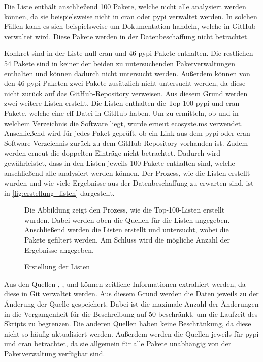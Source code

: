 Die Liste enthält anschließend 100 Pakete, welche nicht alle analysiert werden können, da sie beispielsweise nicht in \gls{cran} oder \gls{pypi} verwaltet werden.
In solchen Fällen kann es sich beispielsweise um Dokumentation handeln, welche in GitHub verwaltet wird.
Diese Pakete werden in der Datenbeschaffung nicht betrachtet.

Konkret sind in der Liste null \gls{cran} und 46 \gls{pypi} Pakete enthalten.
Die restlichen 54 Pakete sind in keiner der beiden zu untersuchenden Paketverwaltungen enthalten und können dadurch nicht untersucht werden.
Außerdem können von den 46 \gls{pypi} Paketen zwei Pakete zusätzlich nicht untersucht werden, da diese nicht zurück auf das GitHub-Repository verweisen.
Aus diesem Grund werden zwei weitere Listen erstellt.
Die Listen enthalten die Top-100 \gls{pypi} und \gls{cran} Pakete, welche eine \gls{cff}-Datei in GitHub haben.
Um zu ermitteln, ob und in welchem Verzeichnis die Software liegt, wurde erneut ecosyste.ms verwendet.
Anschließend wird für jedes Paket geprüft, ob ein Link aus dem \gls{pypi} oder \gls{cran} Software-Verzeichnis zurück zu dem GitHub-Repository vorhanden ist.
Zudem werden erneut die doppelten Einträge nicht betrachtet.
Dadurch wird gewährleistet, dass in den Listen jeweils 100 Pakete enthalten sind, welche anschließend alle analysiert werden können.
Der Prozess, wie die Listen erstellt wurden und wie viele Ergebnisse aus der Datenbeschaffung zu erwarten sind, ist in \autoref{fig:erstellung_listen} dargestellt.

\begin{figure}
    \begin{center}
        
    \end{center}
    \caption{Erstellung der Listen}
    \label{fig:erstellung_listen}
    \small
    Die Abbildung zeigt den Prozess, wie die Top-100-Listen erstellt wurden. Dabei werden oben die Quellen für die Listen angegeben. Anschließend werden die Listen erstellt und untersucht, wobei die Pakete gefiltert werden. Am Schluss wird die mögliche Anzahl der Ergebnisse angegeben.
\end{figure}

Aus den Quellen , ,  und  können zeitliche Informationen extrahiert werden, da diese in Git verwaltet werden.
Aus diesem Grund werden die Daten jeweils zu der Änderung der Quelle gespeichert.
Dabei ist die maximale Anzahl der Änderungen in die Vergangenheit für die Beschreibung auf 50 beschränkt, um die Laufzeit des Skripts zu begrenzen.
Die anderen Quellen haben keine Beschränkung, da diese nicht so häufig aktualisiert werden.
Außerdem werden die Quellen jeweils für \gls{pypi} und \gls{cran} betrachtet, da sie allgemein für alle Pakete unabhängig von der Paketverwaltung verfügbar sind.

